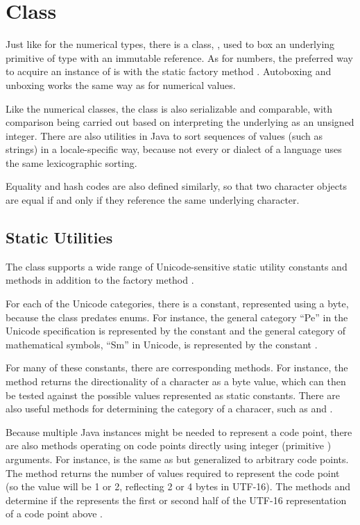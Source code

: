 \section{ Class}

Just like for the numerical types, there is a class,
, used to box an underlying primitive
of type  with an immutable reference.  As for numbers, the
preferred way to acquire an instance of  is with the
static factory method .  Autoboxing and
unboxing works the same way as for numerical values.  

Like the numerical classes, the  class is also
serializable and comparable, with comparison being carried out based
on interpreting the underlying  as an unsigned integer.
There are also utilities in Java to sort sequences of 
values (such as strings) in a locale-specific way, because not every
or dialect of a language uses the same lexicographic sorting.

Equality and hash codes are also defined similarly, so that two
character objects are equal if and only if they reference the same
underlying character.

\subsection{Static Utilities}\label{section:char-character-utils}

The  class supports a wide range of Unicode-sensitive
static utility constants and methods in addition to the factory method
.

For each of the Unicode categories, there is a constant, represented
using a byte, because the class predates enums.  For instance, the
general category ``Pe'' in the Unicode specification is represented by
the constant  and the general category of
mathematical symbols, ``Sm'' in Unicode, is represented by the
constant .

For many of these constants, there are corresponding methods.  For
instance, the method  returns the
directionality of a character as a byte value, which can then be tested
against the possible values represented as static constants.  There
are also useful methods for determining the category of a characer,
such as  and .

Because multiple Java  instances might be needed to
represent a code point, there are also methods operating on code
points directly using integer (primitive ) arguments.  For
instance,  is the same as 
but generalized to arbitrary code points.  The method
 returns the number of  values
required to represent the code point (so the value will be 1 or 2,
reflecting 2 or 4 bytes in UTF-16).  The methods
 and  determine
if the  represents the first or second half of the UTF-16
representation of a code point above .  

